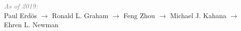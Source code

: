\documentclass[10pt]{article}
\renewcommand\emph[1]{#1}
\renewcommand{\section}[1]{\pagebreak[3]%
    \vspace{1.3\baselineskip}%
    \phantomsection\addcontentsline{toc}{section}{#1}%
    \noindent\llap{\scshape\smash{\parbox[t]{\marginparwidth}{\hyphenpenalty=10000\raggedright #1}}}%
    \vspace{-\baselineskip}\par}
\begin{document}
\textit{\textcolor{grey}{As of 2019:}}\\
Paul Erdös $\rightarrow$ Ronald L. Graham $\rightarrow$ Feng Zhou $\rightarrow$ Michael J. Kahana $\rightarrow$ Ehren L. Newman\\




%
%
%
%
%
%
%
%
\end{document}
